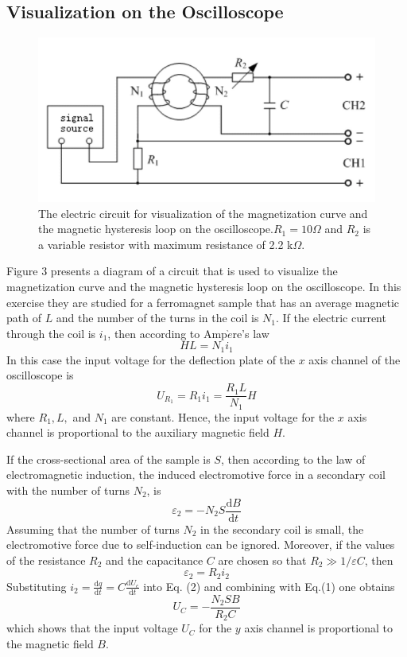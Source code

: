 \documentclass[12pt]{article}
\begin{document}
\subsection{Visualization on the Oscilloscope}
\begin{figure}[H]
\centering
\includegraphics[scale=0.5]{P3.jpg}
\caption{The electric circuit for visualization of the magnetization curve and the magnetic
hysteresis loop on the oscilloscope.$R_1=10\Omega$ and $R_2$ is a variable resistor with maximum resistance of 2.2 k$\Omega$.}
\end{figure}
Figure 3 presents a diagram of a circuit that is used to visualize the magnetization
curve and the magnetic hysteresis loop on the oscilloscope. In this exercise they are
studied for a ferromagnet sample that has an average magnetic path of $L$ and the number
of the turns in the coil is $N_1$. If the electric current through the coil is $i_1$, then according to Amp$\grave{e}$re's law$$HL=N_1i_1$$In this case the input voltage for the deflection plate of the $x$ axis channel of the oscilloscope is 
$$U_{R_1}=R_1i_1=\frac{R_1L}{N_1}H$$
where $R_1,L,$ and $N_1$ are constant. Hence, the input voltage for the $x$ axis channel is
proportional to the auxiliary magnetic field $H$.
\par If the cross-sectional area of the sample is $S$, then according to the law of electromagnetic induction, the induced electromotive force in a secondary coil with the number of turns $N_2$, is 
\begin{equation}
\varepsilon_2=-N_2S\frac{\mathrm{d}B}{\mathrm{d}t}
\end{equation}
Assuming that the number of turns $N_2$ in the secondary coil is small, the electromotive
force due to self-induction can be ignored. Moreover, if the values of the resistance $R_2$
and the capacitance $C$ are chosen so that $R_2\gg1/\varepsilon C$, then
\begin{equation}
\varepsilon_2=R_2i_2
\end{equation}
Substituting $i_2=\frac{\mathrm{d}q}{\mathrm{d}t}=C\frac{\mathrm{d}U_c}{\mathrm{d}t}$ into Eq. (2) and combining with Eq.(1) one obtains $$U_C=-\frac{N_2SB}{R_2C}$$which shows that the input voltage $U_C$ for the $y$ axis channel is proportional to the magnetic field $B$.
\end{document}
